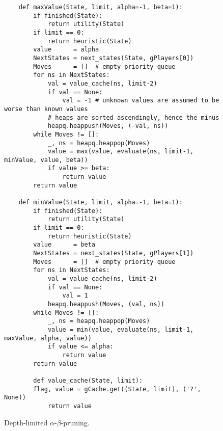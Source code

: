 \begin{figure}[!ht]
\centering
\begin{verbatim}
    def maxValue(State, limit, alpha=-1, beta=1):
        if finished(State):
            return utility(State)
        if limit == 0:
            return heuristic(State)
        value      = alpha
        NextStates = next_states(State, gPlayers[0])
        Moves      = []  # empty priority queue
        for ns in NextStates:
            val = value_cache(ns, limit-2) 
            if val == None:
                val = -1 # unknown values are assumed to be worse than known values
            # heaps are sorted ascendingly, hence the minus
            heapq.heappush(Moves, (-val, ns))
        while Moves != []:
            _, ns = heapq.heappop(Moves)
            value = max(value, evaluate(ns, limit-1, minValue, value, beta))
            if value >= beta:
                return value
        return value
    
    def minValue(State, limit, alpha=-1, beta=1):
        if finished(State):
            return utility(State)
        if limit == 0:
            return heuristic(State)
        value      = beta
        NextStates = next_states(State, gPlayers[1])
        Moves      = []  # empty priority queue
        for ns in NextStates:
            val = value_cache(ns, limit-2)
            if val == None:
                val = 1
            heapq.heappush(Moves, (val, ns))
        while Moves != []:
            _, ns = heapq.heappop(Moves)
            value = min(value, evaluate(ns, limit-1, maxValue, alpha, value))
            if value <= alpha:
                return value
        return value
    
        def value_cache(State, limit):
        flag, value = gCache.get((State, limit), ('?', None))
            return value
\end{verbatim}
\caption{Depth-limited $\alpha$-$\beta$-pruning.}
\label{fig:Game.ipynb}
\end{figure}
\FloatBarrier



